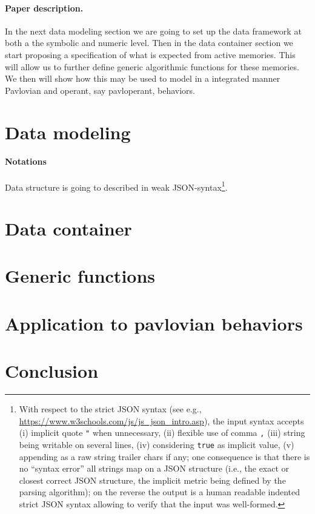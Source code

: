 \documentclass[a4,12pt,twoside]{article}
\begin{document}
\paragraph{Paper description.} In the next data modeling section we are going to set up the data framework at both a the symbolic and numeric level. Then in the data container section we start proposing a specification of what is expected from active memories. This will allow us to further define generic algorithmic functions for these memories. We then will show how this may be used to model in a integrated manner Pavlovian and operant, say pavloperant, behaviors.

\iftrue

\section{Data modeling}

\paragraph{Notations} Data structure is going to described in weak JSON-syntax\footnote{With respect to the strict JSON syntax (see e.g., \href{https://www.w3schools.com/js/js\_json\_intro.asp}{https://www.w3schools.com/js/js\_json\_intro.asp}), the input syntax accepts (i) implicit quote {\tt "} when unnecessary, (ii) flexible use of comma {\tt ,} (iii) string being writable on several lines, (iv) considering {\tt true} as implicit value, (v) appending as a raw string trailer chars if any; one consequence is that there is no ``syntax error'' all strings map on a JSON structure (i.e., the exact or closest correct JSON structure, the implicit metric being defined by the parsing algorithm); on the reverse the output is a human readable indented strict JSON syntax allowing to verify that the input was well-formed.}. 

\section{Data container}

\section{Generic functions}

\section{Application to pavlovian behaviors}

\section{Conclusion}

\fi

{\scriptsize  }

\end{document}
